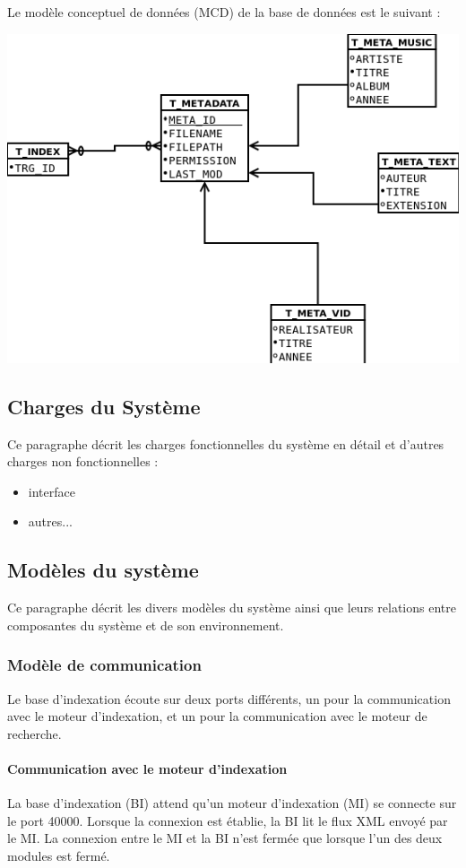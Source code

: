 Le modèle conceptuel de données (MCD) de la base de données est le suivant :
\begin{center}
\includegraphics[scale=0.7]{mcd.png}
\end{center}


\subsection{Charges du Système}
Ce paragraphe décrit les charges fonctionnelles du système en détail et d'autres charges non fonctionnelles : 
\begin{itemize}
 \item interface
 \item autres...
\end{itemize}

\subsection{Modèles du système}
Ce paragraphe décrit les divers modèles du système ainsi que leurs relations entre composantes du système et de son environnement.

\subsubsection{Modèle de communication}
Le base d'indexation écoute sur deux ports différents, un pour la communication avec le moteur d'indexation, 
et un pour la communication avec le moteur de recherche.

\paragraph{Communication avec le moteur d'indexation}
La base d'indexation (BI) attend qu'un moteur d'indexation (MI) se connecte sur le port 40000. Lorsque la connexion est établie, 
la BI lit le flux XML envoyé par le MI. La connexion entre le MI et la BI n'est fermée que lorsque l'un des deux modules
est fermé.

